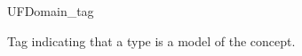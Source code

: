 \begin{ccRefClass}{UFDomain_tag}
\label{UFDomain_tag}

\ccDefinition
Tag indicating that a type is a model of the  concept. 


\ccInheritsFrom
{}

\ccIsModel
{}

\ccSeeAlso
{} \\
\\
\end{ccRefClass} 